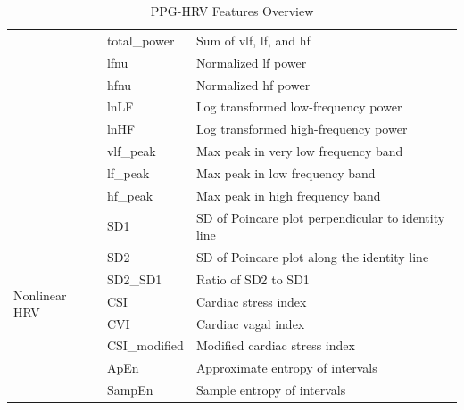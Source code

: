 \begin{table}[H]
{\begin{tabular}{|l|l|l|}
         & total\_power & Sum of vlf, lf, and hf \\
         & lfnu & Normalized lf power \\
         & hfnu & Normalized hf power \\
         & lnLF & Log transformed low-frequency power \\
         & lnHF & Log transformed high-frequency power \\
         & vlf\_peak & Max peak in very low frequency band \\
         & lf\_peak & Max peak in low frequency band \\
         & hf\_peak & Max peak in high frequency band \\ \hline
        \multirow{9}{*}{Nonlinear HRV} & SD1 & SD of Poincare plot perpendicular to identity line \\
         & SD2 & SD of Poincare plot along the identity line \\
         & SD2\_SD1 & Ratio of SD2 to SD1 \\
         & CSI & Cardiac stress index \\
         & CVI & Cardiac vagal index \\
         & CSI\_modified & Modified cardiac stress index \\
         & ApEn & Approximate entropy of intervals \\
         & SampEn & Sample entropy of intervals \\ \hline
        \end{tabular}
        }
        \caption{PPG-HRV Features Overview}
        \label{tab:ppg_hrv_features}
        \end{table}
        



